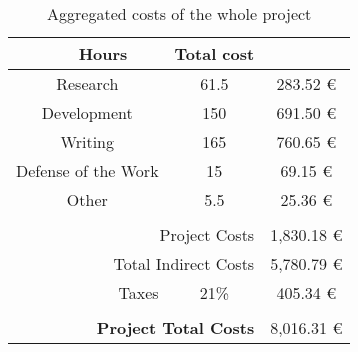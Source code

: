 \begin{table}[p]
    \renewcommand{\arraystretch}{1.5}
    \setlength{\tabcolsep}{.25cm}
    \centering
    \begin{tabular}{|clcc|}
        \hline
        \rowcolor[HTML]{C0C0C0}
        \multicolumn{2}{|c|}{\cellcolor[HTML]{C0C0C0}\textbf{Phase}}               & \multicolumn{1}{c|}{\cellcolor[HTML]{C0C0C0}\textbf{Hours}} & \textbf{Total cost} \\ \hline
        \multicolumn{2}{|c|}{Research}                                             & \multicolumn{1}{c|}{61.5}                                   & 283.52 €            \\ \hline
        \multicolumn{2}{|c|}{Development}                                          & \multicolumn{1}{c|}{150}                                    & 691.50 €            \\ \hline
        \multicolumn{2}{|c|}{Writing}                                              & \multicolumn{1}{c|}{165}                                    & 760.65 €            \\ \hline
        \multicolumn{2}{|c|}{Defense of the Work}                                  & \multicolumn{1}{c|}{15}                                     & 69.15 €             \\ \hline
        \multicolumn{2}{|c|}{Other}                                                & \multicolumn{1}{c|}{5.5}                                    & 25.36 €             \\ \hline
        \rowcolor[HTML]{EFEFEF}
        \multicolumn{4}{|l|}{\cellcolor[HTML]{EFEFEF}}                                                                                                                 \\ \hline
        \multicolumn{3}{|r|}{Project Costs}                                        & 1,830.18 €                                                                        \\ \hline
        \multicolumn{3}{|r|}{Total Indirect Costs}                                 & 5,780.79 €                                                                        \\ \hline
        \multicolumn{2}{|r|}{Taxes}                                                & \multicolumn{1}{c|}{21\%}                                   & 405.34 €            \\ \hline
        \rowcolor[HTML]{EFEFEF}
        \multicolumn{4}{|l|}{\cellcolor[HTML]{EFEFEF}}                                                                                                                 \\ \hline
        \multicolumn{3}{|r|}{\cellcolor[HTML]{C0C0C0}\textbf{Project Total Costs}} & 8,016.31 €                                                                        \\ \hline
    \end{tabular}
    \caption{Aggregated costs of the whole project}
    \label{table:costs}
\end{table}
